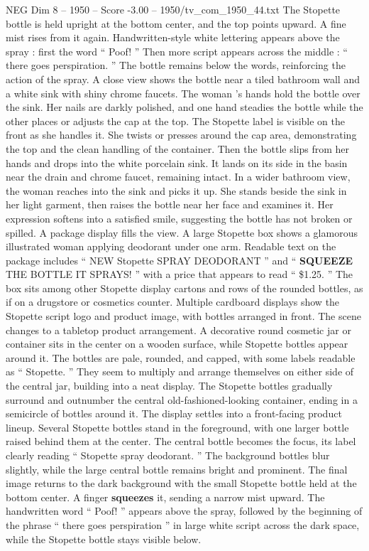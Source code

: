 \begin{textsample}{NEG Dim 8 – 1950 – Score -3.00 – 1950/tv\_com\_1950\_44.txt}
The Stopette bottle is held upright at the bottom center, and the top points upward.
A fine mist rises from it again.
Handwritten-style white lettering appears above the spray : first the word “ Poof! ” Then more script appears across the middle : “ there goes perspiration. ” The bottle remains below the words, reinforcing the action of the spray.
A close view shows the bottle near a tiled bathroom wall and a white sink with shiny chrome faucets.
The woman ’s hands hold the bottle over the sink.
Her nails are darkly polished, and one hand steadies the bottle while the other places or adjusts the cap at the top.
The Stopette label is visible on the front as she handles it.
She twists or presses around the cap area, demonstrating the top and the clean handling of the container.
Then the bottle slips from her hands and drops into the white porcelain sink.
It lands on its side in the basin near the drain and chrome faucet, remaining intact.
In a wider bathroom view, the woman reaches into the sink and picks it up.
She stands beside the sink in her light garment, then raises the bottle near her face and examines it.
Her expression softens into a satisfied smile, suggesting the bottle has not broken or spilled.
A package display fills the view.
A large Stopette box shows a glamorous illustrated woman applying deodorant under one arm.
Readable text on the package includes “ NEW Stopette SPRAY DEODORANT ” and “ \textbf{SQUEEZE} THE BOTTLE IT SPRAYS! ” with a price that appears to read “ \$1.25. ” The box sits among other Stopette display cartons and rows of the rounded bottles, as if on a drugstore or cosmetics counter.
Multiple cardboard displays show the Stopette script logo and product image, with bottles arranged in front.
The scene changes to a tabletop product arrangement.
A decorative round cosmetic jar or container sits in the center on a wooden surface, while Stopette bottles appear around it.
The bottles are pale, rounded, and capped, with some labels readable as “ Stopette. ” They seem to multiply and arrange themselves on either side of the central jar, building into a neat display.
The Stopette bottles gradually surround and outnumber the central old-fashioned-looking container, ending in a semicircle of bottles around it.
The display settles into a front-facing product lineup.
Several Stopette bottles stand in the foreground, with one larger bottle raised behind them at the center.
The central bottle becomes the focus, its label clearly reading “ Stopette spray deodorant. ” The background bottles blur slightly, while the large central bottle remains bright and prominent.
The final image returns to the dark background with the small Stopette bottle held at the bottom center.
A finger \textbf{squeezes} it, sending a narrow mist upward.
The handwritten word “ Poof! ” appears above the spray, followed by the beginning of the phrase “ there goes perspiration ” in large white script across the dark space, while the Stopette bottle stays visible below.

\end{textsample}
